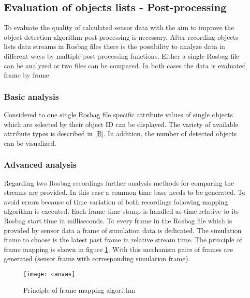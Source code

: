 \subsection{Evaluation of objects lists - Post-processing}
To evaluate the quality of calculated sensor data with the aim to improve the object detection algorithm post-processing is necessary.
After recording objects lists data streams in Rosbag files there is the possibility to analyze data in different ways by multiple post-processing functions. 
Either a single Rosbag file can be analyzed or two files can be compared. In both cases the data is evaluated frame by frame. 

\subsubsection{Basic analysis}

Considered to one single Rosbag file specific attribute values of single objects which are selected by their object \ac{ID} can be displayed. The variety of available attribute types is described in \cref{B}. In addition, the number of detected objects can be visualized. \\

\subsubsection{Advanced analysis}
\label{sssec:eval}

Regarding two Rosbag recordings further analysis methods for comparing the streams are provided. In this case a common time base needs to be generated. To avoid errors because of time variation of both recordings following mapping algorithm is executed. Each frame time stamp is handled as time relative to its Rosbag start time in milliseconds. To every frame in the Rosbag file which is provided by sensor data a frame of simulation data is dedicated. The simulation frame to choose is the latest past frame in relative stream time. The principle of frame mapping is shown in figure \ref{fig:frame_mapping}. With this mechanism pairs of frames are generated (sensor frame with corresponding simulation frame).

\begin{figure}[t]
	\centering
	\texttt{[image: canvas]}
	\caption{Principle of frame mapping algorithm}
	\label{fig:frame_mapping}
\end{figure}

